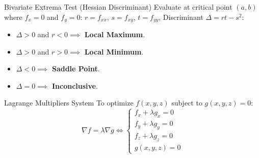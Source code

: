 \begin{formulabox}{Bivariate Extrema Test (Hessian Discriminant)}
Evaluate at critical point $(a,b)$ where $f_x = 0$ and $f_y = 0$:
$r = f_{xx}$, $s = f_{xy}$, $t = f_{yy}$, Discriminant $\Delta = rt - s^2$:
\begin{itemize}
    \item $\Delta > 0$ and $r < 0 \implies$ \textbf{Local Maximum}.
    \item $\Delta > 0$ and $r > 0 \implies$ \textbf{Local Minimum}.
    \item $\Delta < 0 \implies$ \textbf{Saddle Point}.
    \item $\Delta = 0 \implies$ \textbf{Inconclusive}.
\end{itemize}
\end{formulabox}

\begin{formulabox}{Lagrange Multipliers System}
To optimize $f(x,y,z)$ subject to $g(x,y,z) = 0$:
\begin{equation*}
\nabla f = \lambda \nabla g \iff \begin{cases} f_x + \lambda g_x = 0 \\ f_y + \lambda g_y = 0 \\ f_z + \lambda g_z = 0 \\ g(x,y,z) = 0 \end{cases}
\end{equation*}
\end{formulabox}
